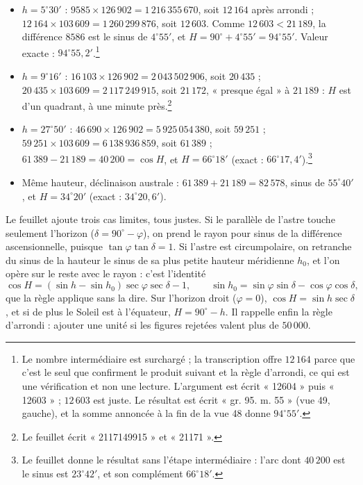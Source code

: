 \documentclass[11pt,a4paper]{article}
\begin{document}
\begin{itemize}
  \item $h = 5^\circ 30'$ : $9585 \times 126\,902 = 1\,216\,355\,670$, soit
    $12\,164$ après arrondi ; $12\,164 \times 103\,609 = 1\,260\,299\,876$, soit
    $12\,603$. Comme $12\,603 < 21\,189$, la différence $8586$ est le sinus de
    $4^\circ 55'$, et $H = 90^\circ + 4^\circ 55' = 94^\circ 55'$. Valeur exacte :
    $94^\circ 55{,}2'$.\footnote{Le nombre intermédiaire est surchargé ; la
    transcription offre $12\,164$ parce que c'est le seul que confirment le
    produit suivant et la règle d'arrondi, ce qui est une vérification et non
    une lecture. L'argument est écrit « 12604 » puis « 12603 » ; $12\,603$ est
    juste. Le résultat est écrit « gr. 95. m. 55 » (vue 49, gauche), et la somme
    annoncée à la fin de la vue 48 donne $94^\circ 55'$.}
  \item $h = 9^\circ 16'$ : $16\,103 \times 126\,902 = 2\,043\,502\,906$, soit
    $20\,435$ ; $20\,435 \times 103\,609 = 2\,117\,249\,915$, soit $21\,172$,
    « presque égal » à $21\,189$ : $H$ est d'un quadrant, à une minute
    près.\footnote{Le feuillet écrit « 2117149915 » et « 21171 ».}
  \item $h = 27^\circ 50'$ : $46\,690 \times 126\,902 = 5\,925\,054\,380$, soit
    $59\,251$ ; $59\,251 \times 103\,609 = 6\,138\,936\,859$, soit $61\,389$ ;
    $61\,389 - 21\,189 = 40\,200 = \cos H$, et $H = 66^\circ 18'$ (exact :
    $66^\circ 17{,}4'$).\footnote{Le feuillet donne le résultat sans l'étape
    intermédiaire : l'arc dont $40\,200$ est le sinus est $23^\circ 42'$, et son
    complément $66^\circ 18'$.}
  \item Même hauteur, déclinaison australe : $61\,389 + 21\,189 = 82\,578$, sinus
    de $55^\circ 40'$, et $H = 34^\circ 20'$ (exact : $34^\circ 20{,}6'$).
\end{itemize}

Le feuillet ajoute trois cas limites, tous justes. Si le parallèle de l'astre
touche seulement l'horizon ($\delta = 90^\circ - \varphi$), on prend le rayon pour
sinus de la différence ascensionnelle, puisque $\tan\varphi\tan\delta = 1$. Si
l'astre est circumpolaire, on retranche du sinus de la hauteur le sinus de sa plus
petite hauteur méridienne $h_0$, et l'on opère sur le reste avec le rayon :
c'est l'identité
\[
\cos H = (\sin h - \sin h_0)\sec\varphi\sec\delta - 1,
\qquad \sin h_0 = \sin\varphi\sin\delta - \cos\varphi\cos\delta ,
\]
que la règle applique sans la dire. Sur l'horizon droit ($\varphi = 0$),
$\cos H = \sin h\sec\delta$, et si de plus le Soleil est à l'équateur,
$H = 90^\circ - h$. Il rappelle enfin la règle d'arrondi : ajouter une unité si
les figures rejetées valent plus de $50\,000$.
\end{document}
